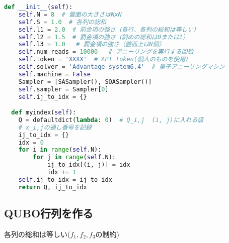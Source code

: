 \documentclass[uplatex,dvipdfmx,a4paper,11pt,oneside,openany]{jsbook}
\begin{document}
\begin{lstlisting}[language=Python]
  def __init__(self):
    self.N = 8  # 盤面の大きさはNxN
    self.S = 1.0  # 各列の総和
    self.l1 = 2.0  # 罰金項の強さ（各行、各列の総和は等しい）
    self.l2 = 1.5  # 罰金項の強さ（斜めの総和は0または1）
    self.l3 = 1.0   # 罰金項の強さ（盤面上はN個）
    self.num_reads = 10000   # アニーリングを実行する回数
    self.token = 'XXXX'  # API token(個人のものを使用)
    self.solver = 'Advantage_system6.4'  # 量子アニーリングマシン
    self.machine = False
    Sampler = [SASampler(), SQASampler()]
    self.sampler = Sampler[0]
    self.ij_to_idx = {}

  def myindex(self):
    Q = defaultdict(lambda: 0)  # Q_i,j  (i, j)に入れる値
    # x_i,jの通し番号を記録
    ij_to_idx = {}
    idx = 0
    for i in range(self.N):
        for j in range(self.N):
            ij_to_idx[(i, j)] = idx
            idx += 1
    self.ij_to_idx = ij_to_idx
    return Q, ij_to_idx
\end{lstlisting}

\subsection{QUBO行列を作る}

各列の総和は等しい($f_1, f_2, f_3$の制約)
\end{document}
